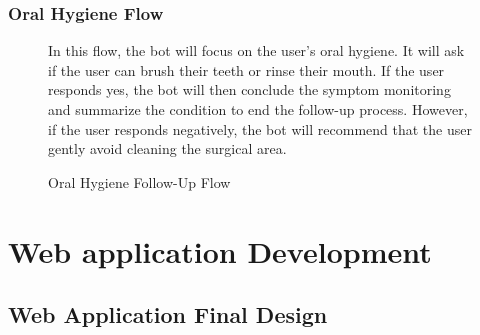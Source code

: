 \documentclass[12pt,oneside,openright,a4paper]{cpe-english-project}
\begin{document}
        \subsubsection{Oral Hygiene Flow}
          \begin{figure}[H]
            \centering
            \caption{Oral Hygiene Follow-Up Flow}\label{fig:FollowUpFlow6}
            \begin{justify}
              \qquad In this flow, the bot will focus on the user's oral hygiene. It will ask if the user can brush their teeth or rinse their mouth. If the user responds yes, the bot will then conclude the symptom monitoring and summarize the condition to end the follow-up process. However, if the user responds negatively, the bot will recommend that the user gently avoid cleaning the surgical area.\par
            \end{justify}        
          \end{figure}
  
    \section{Web application Development}
      \subsection{Web Application Final Design}
\end{document}
